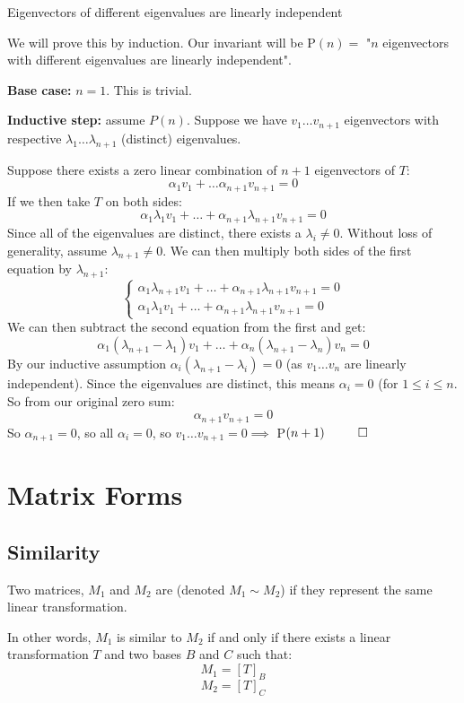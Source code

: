 \documentclass[10pt]{article}
\begin{document}
\newpage
\begin{theorem}{Eigenvectors of different eigenvalues are linearly independent}

We will prove this by induction. Our invariant will be P$(n) =$ "$n$ eigenvectors with different eigenvalues are linearly independent".

\textbf{Base case:} $n=1$. This is trivial.

\textbf{Inductive step:} assume $P(n)$. Suppose we have $v_{1}\dots v_{n+1}$ eigenvectors with respective $\lambda_1\dots\lambda_{n+1}$ (distinct) eigenvalues.

Suppose there exists a zero linear combination of $n+1$ eigenvectors of $T$:
\[ \alpha_1v_1 +\dots\alpha_{n+1}v_{n+1}=0 \]
If we then take $T$ on both sides:
\[ \alpha_1\lambda_1 v_1 +\dots+\alpha_{n+1}\lambda_{n+1}v_{n+1} = 0 \]
Since all of the eigenvalues are distinct, there exists a $\lambda_i\neq0$. Without loss of generality, assume $\lambda_{n+1}\neq0$. We can then multiply both sides of the first equation by $\lambda_{n+1}$:
\[ \left\{\begin{array}{l} \alpha_1\lambda_{n+1}v_1 +\dots+\alpha_{n+1}\lambda_{n+1}v_{n+1} = 0 \\ \alpha_1\lambda_1 v_1 +\dots+\alpha_{n+1}\lambda_{n+1}v_{n+1} = 0\end{array}\right. \]
We can then subtract the second equation from the first and get:
\[ \alpha_1(\lambda_{n+1}-\lambda_1)v_1 +\dots+ \alpha_n(\lambda_{n+1} - \lambda_n)v_n = 0 \]
By our inductive assumption $\alpha_i(\lambda_{n+1}-\lambda_i) = 0$ (as $v_1\dots v_n$ are linearly independent). Since the eigenvalues are distinct, this means $\alpha_i=0$ (for $1\leq i\leq n$. So from our original zero sum:
\[ \alpha_{n+1}v_{n+1}=0 \]
So $\alpha_{n+1} = 0$, so all $\alpha_i=0$, so $v_1\dots v_{n+1}=0 \implies$ P$(n+1) ~~\qed$
\end{theorem}

\newpage
\section{Matrix Forms}
\subsection{Similarity}

\begin{definition*}[simdef]

Two matrices, $M_1$ and $M_2$ are  (denoted $M_1\sim M_2$) if they represent the same linear transformation.

In other words, $M_1$ is similar to $M_2$ if and only if there exists a linear transformation $T$ and two bases $B$ and $C$ such that:
\[ M_1 = \left[T\right]_B \]
\[ M_2 = \left[T\right]_C \]

\end{definition*}
\end{document}
